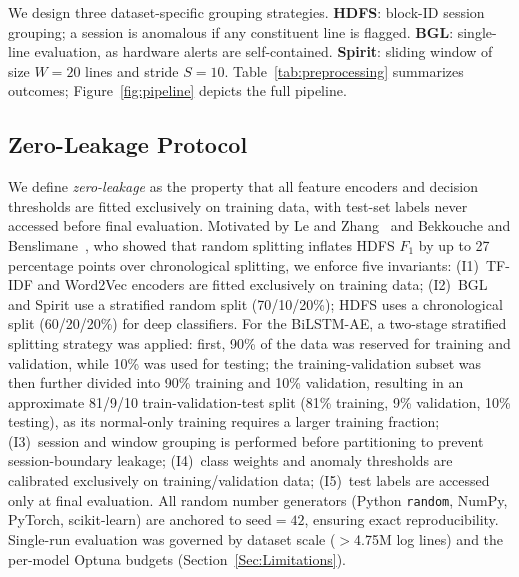 \documentclass{elektr}
\begin{document}
We design three dataset-specific grouping strategies.
\textbf{HDFS}: block-ID session grouping; a session is anomalous if any constituent
line is flagged.
\textbf{BGL}: single-line evaluation, as hardware alerts are self-contained.
\textbf{Spirit}: sliding window of size $W{=}20$ lines and stride $S{=}10$.
Table~\ref{tab:preprocessing} summarizes outcomes; Figure~\ref{fig:pipeline}
depicts the full pipeline.

\subsection{Zero-Leakage Protocol}

We define \emph{zero-leakage} as the property that all feature encoders and
decision thresholds are fitted exclusively on training data, with test-set labels
never accessed before final evaluation. Motivated by Le and Zhang~\cite{ref21} and
Bekkouche and Benslimane~\cite{ref1}, who showed that random splitting inflates
HDFS $F_1$ by up to 27 percentage points over chronological splitting, we enforce
five invariants:
(I1)~TF-IDF and Word2Vec encoders are fitted exclusively on training data;
(I2)~BGL and Spirit use a stratified random split (70/10/20\%); HDFS uses a
chronological split (60/20/20\%) for deep classifiers. For the BiLSTM-AE, a two-stage stratified splitting strategy was applied: first, 90\% of the data was reserved for training and validation, while 10\% was used for testing; the training-validation subset was then further divided into 90\% training and 10\% validation, resulting in an approximate 81/9/10 train-validation-test split (81\% training, 9\% validation, 10\% testing), as its normal-only training requires a larger
training fraction;
(I3)~session and window grouping is performed before partitioning to prevent
session-boundary leakage;
(I4)~class weights and anomaly thresholds are calibrated exclusively on
training/validation data;
(I5)~test labels are accessed only at final evaluation.
All random number generators (Python \texttt{random}, NumPy, PyTorch,
scikit-learn) are anchored to $\text{seed}=42$, ensuring exact reproducibility.
Single-run evaluation was governed by dataset scale ($>$4.75M log lines) and the
per-model Optuna budgets (Section~\ref{Sec:Limitations}).
\end{document}
